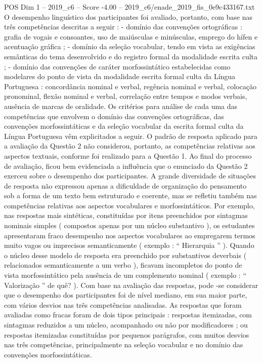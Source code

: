 \begin{textsample}{POS Dim 1 – 2019\_c6 – Score -4.00 – 2019\_c6/enade\_2019\_fis\_0e9c433167.txt}
O desempenho linguístico dos participantes foi avaliado, portanto, com base nas três competências descritas a seguir : - domínio das convenções ortográficas : grafia de vogais e consoantes, uso de maiúsculas e minúsculas, emprego do hífen e acentuação gráfica ; - domínio da seleção vocabular, tendo em vista as exigências semânticas do tema desenvolvido e do registro formal da modalidade escrita culta ; - domínio das convenções de caráter morfossintático estabelecidas como modelares do ponto de vista da modalidade escrita formal culta da Língua Portuguesa : concordância nominal e verbal, regência nominal e verbal, colocação pronominal, flexão nominal e verbal, correlação entre tempos e modos verbais, ausência de marcas de oralidade.
Os critérios para análise de cada uma das competências que envolvem o domínio das convenções ortográficas, das convenções morfossintáticas e da seleção vocabular da escrita formal culta da Língua Portuguesa vêm explicitados a seguir.
O padrão de resposta aplicado para a avaliação da Questão 2 não considerou, portanto, as competências relativas aos aspectos textuais, conforme foi realizado para a Questão 1.
Ao final do processo de avaliação, ficou bem evidenciada a influência que o enunciado da Questão 2 exerceu sobre o desempenho dos participantes.
A grande diversidade de situações de resposta não expressou apenas a dificuldade de organização do pensamento sob a forma de um texto bem estruturado e coerente, mas se refletiu também nas competências relativas aos aspectos vocabulares e morfossintáticos.
Por exemplo, nas respostas mais sintéticas, constituídas por itens preenchidos por sintagmas nominais simples ( compostos apenas por um núcleo substantivo ), os estudantes apresentaram fraco desempenho nos aspectos vocabulares ao empregarem termos muito vagos ou imprecisos semanticamente ( exemplo : “ Hierarquia ” ).
Quando o núcleo desse modelo de resposta era preenchido por substantivos deverbais ( relacionados semanticamente a um verbo ), ficavam incompletos do ponto de vista morfossintático pela ausência de um complemento nominal ( exemplo : “ Valorização ” de quê? ).
Com base na avaliação das respostas, pode -se considerar que o desempenho dos participantes foi de nível mediano, em sua maior parte, com vários desvios nas três competências analisadas.
As respostas que foram avaliadas como fracas foram de dois tipos principais : respostas itemizadas, com sintagmas reduzidos a um núcleo, acompanhado ou não por modificadores ; ou respostas itemizadas constituídas por pequenos parágrafos, com muitos desvios nas três competências, principalmente na seleção vocabular e no domínio das convenções morfossintáticas.

\end{textsample}
